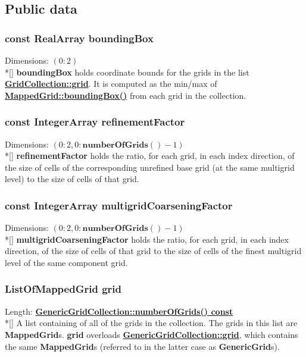 \documentclass{article}
\begin{document}
\subsection{Public data}
\label{GridCollection::PublicData}

  \subsubsection{const RealArray boundingBox}
  \label{GridCollection::boundingBox}
    Dimensions: $(0\colon2)$ \\*[\parskip]
    \textbf{boundingBox} holds coordinate bounds for the grids in the list {\bf{}\hyperref{grid}{grid \rm(\S}{)}{GridCollection::grid}}.
    It is computed as the min/max of {\bf{}\hyperref{MappedGrid::boundingBox()}{MappedGrid::boundingBox() \rm(\S}{)}{MappedGrid::boundingBox()}}
    from each grid in the collection.

  \subsubsection{const IntegerArray refinementFactor}
  \label{GridCollection::refinementFactor}
    Dimensions: $(0\colon2,0\colon\textbf{numberOfGrids}()-1)$ \\*[\parskip]
    \textbf{refinementFactor} holds the ratio, for each grid, in each index direction, of the size of cells of the corresponding unrefined
    base grid (at the same multigrid level) to the size of cells of that grid.

  \subsubsection{const IntegerArray multigridCoarseningFactor}
  \label{GridCollection::multigridCoarseningFactor}
    Dimensions: $(0\colon2,0\colon\textbf{numberOfGrids}()-1)$ \\*[\parskip]
    \textbf{multigridCoarseningFactor} holds the ratio, for each grid, in each index direction, of the size of cells of that grid
    to the size of cells of the finest multigrid level of the same component grid.

  \subsubsection{ListOfMappedGrid grid}
  \label{GridCollection::grid}
    Length: {\bf{}\hyperref{numberOfGrids()}{numberOfGrids() \rm(\S}{)}{GenericGridCollection::numberOfGrids() const}} \\*[\parskip]
    A list containing of all of the grids in the collection. The grids in this list are \textbf{MappedGrid}s.
    \textbf{grid} overloads
    {\bf{}\hyperref{GenericGridCollection::grid}{GenericGridCollection::grid \rm(\S}{)}{GenericGridCollection::grid}},
    which contains the same \textbf{MappedGrid}s (referred to in the latter case as \textbf{GenericGrid}s).
\end{document}
